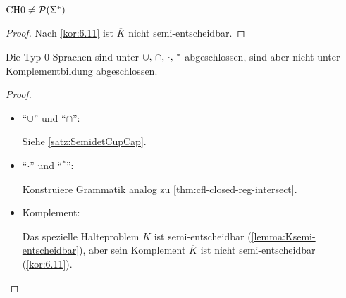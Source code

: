 {\begin{Satz}
 $\text{CH{0}}\neq \mathcal{P}(\Sigma^*)$
\end{Satz}
\begin{proof}
 Nach \autoref{kor:6.11} ist $\overline{K}$ nicht semi-entscheidbar.
\end{proof}



\begin{Satz}[name={[Abgeschlossenheit von Typ-0 Sprachen]}]\label{satz:Typ-0-abgeschl}
	Die Typ-0 Sprachen sind unter $\thinmuskip=6mu\cup,\cap,\cdot,{}^*$ abgeschlossen, sind aber nicht unter Komplementbildung abgeschlossen.
\end{Satz}
\begin{proof}~
    \begin{itemize}
     \item "`$\cup$"' und "`$\cap$"':
     
     Siehe \autoref{satz:SemidetCupCap}.

     \item  "`$\cdot$"' und "`$^*$"':
     
     Konstruiere Grammatik analog zu \autoref{thm:cfl-closed-reg-intersect}.
     
     \item Komplement:
     
     Das spezielle Halteproblem $K$ ist semi-entscheidbar (\autoref{lemma:Ksemi-entscheidbar}),
     aber sein Komplement $\overline{K}$ ist nicht semi-entscheidbar (\autoref{kor:6.11}).
     \qedhere
     \end{itemize}
\end{proof}

% 
% 
}
